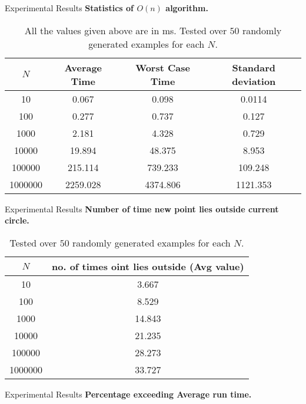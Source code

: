 \documentclass{beamer}
\begin{document}
\begin{frame}{Experimental Results}
\textbf{Statistics of $O(n)$ algorithm.}
\begin{table}
\centering
\begin{tabular}{|c| c |c |c|} 
 \hline\hline
 $N$ & Average Time & Worst Case Time & Standard deviation \\ [0.5ex] 
 \hline\hline
10 & 0.067  &  0.098  &  0.0114
 \\ \hline
100 & 0.277  &  0.737  &  0.127
 \\ \hline
1000 & 2.181  &  4.328  &  0.729
 \\ \hline
10000 & 19.894  &  48.375  &  8.953
 \\ \hline
100000 & 215.114  &  739.233  &  109.248
 \\ \hline
1000000 & 2259.028  &  4374.806  &  1121.353
 \\ \hline
\end{tabular}
\caption{All the values given above are in ms. Tested over $50$ randomly generated examples for each $N$.}\end{table}
\end{frame}

\begin{frame}{Experimental Results}
\textbf{Number of time new point lies outside current circle.}
\begin{table}
\centering
\begin{tabular}{|c| c|} 
 \hline\hline
 $N$ & no. of times oint lies outside (Avg value) \\ [0.5ex] 
 \hline\hline
10 & 3.667
 \\ \hline
100 & 8.529
 \\ \hline
1000 & 14.843
 \\ \hline
10000 & 21.235
 \\ \hline
100000 & 28.273
 \\ \hline
1000000 & 33.727
 \\ \hline
\end{tabular}
\caption{Tested over $50$ randomly generated examples for each $N$.}\end{table}
\end{frame}


\begin{frame}{Experimental Results}
\textbf{Percentage exceeding Average run time.}
\begin{table}
\centering
{}
\caption{Tested over $250$ randomly generated examples for each $N$.}\end{table}
\end{frame}
\end{document}
